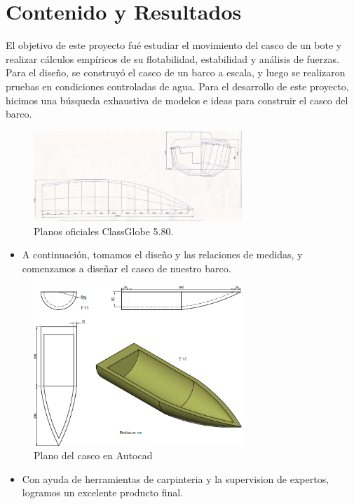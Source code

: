 \documentclass[letterpaper]{article}
\begin{document}
\section{Contenido y Resultados}
El objetivo de este proyecto fué estudiar el movimiento del casco de un bote y realizar cálculos empíricos
de su flotabilidad, estabilidad y análisis de fuerzas. Para el diseño, se construyó el casco de un barco 
a escala, y luego se realizaron pruebas en condiciones controladas de agua.
Para el desarrollo de este proyecto, hicimos una búsqueda exhaustiva de modelos e ideas para construir el casco del barco.
\begin{figure}[H]
	\centering
	\includegraphics[width=0.7\textwidth]{planosbarc.png}
	\caption{ Planos oficiales ClassGlobe 5.80.}
	\label{fig:imagen}
\end{figure}
\begin{itemize}
	\item A continuación, tomamos el diseño y las relaciones de medidas, y comenzamos a diseñar el casco de nuestro barco.
\end{itemize}
\begin{figure}[H]
	\centering
	\includegraphics[width=0.7\textwidth]{Cascobarco.png}
	\caption{Plano del casco en Autocad}
	\label{fig:imagen1}
\end{figure}
\begin{itemize}
	\item Con ayuda de herramientas de carpinteria y la supervision de expertos, logramos un excelente producto final.
\end{itemize}
\end{document}
